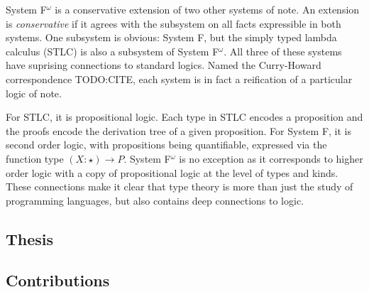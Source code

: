 System F$^\omega$ is a conservative extension of two other systems of note.
An extension is \textit{conservative} if it agrees with the subsystem on all facts expressible in both systems.
One subsystem is obvious: System F, but the simply typed lambda calculus (STLC) is also a subsystem of System F$^\omega$.
All three of these systems have suprising connections to standard logics.
Named the Curry-Howard correspondence TODO:CITE, each system is in fact a reification of a particular logic of note.

For STLC, it is propositional logic.
Each type in STLC encodes a proposition and the proofs encode the derivation tree of a given proposition.
For System F, it is second order logic, with propositions being quantifiable, expressed via the function type $(X : \star) \to P$.
System F$^\omega$ is no exception as it corresponds to higher order logic with a copy of propositional logic at the level of types and kinds.
These connections make it clear that type theory is more than just the study of programming languages, but also contains deep connections to logic.





\subsection{Thesis}


\subsection{Contributions}


